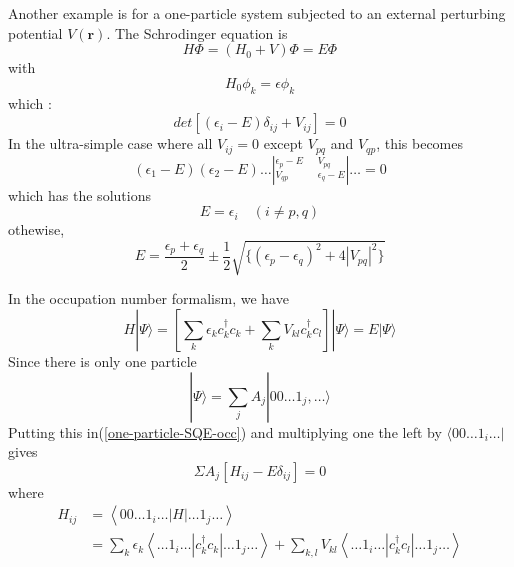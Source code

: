 Another example is for a one-particle system subjected to an external perturbing potential $V(\mathbf{r})$. The Schrodinger equation is
$$
H\Phi=(H_0+V)\Phi=E\Phi
$$
with
$$
H_0\phi_k=\epsilon\phi_k
$$
which \textbf{}:
$$
det[(\epsilon_i-E)\delta_{ij}+V_{ij}]=0
$$
In the ultra-simple case where all $V_{ij}=0$ except $V_{pq}$ and $V_{qp}$, this becomes
$$\left(\epsilon_{1}-E\right)\left(\epsilon_{2}-E\right) \ldots\left|_{V_{q p}} ^{\epsilon_{p}-E}\quad {}^{V_{p q}}_{\epsilon_{q}-E} \right| \ldots=0$$
which has the solutions
$$
E=\epsilon_i\quad(i\neq p,q)
$$
othewise,
$$E=\frac{\epsilon_{p}+\epsilon_{q}}{2} \pm \frac{1}{2} \sqrt{\{\left(\epsilon_{p}-\epsilon_{q}\right)^{2}+4\left|V_{p q}\right|^{2}\}}$$

In the occupation number formalism, we have
\begin{equation}
    H|\Psi\rangle=\left[\sum_{k} \epsilon_{k} c_{k}^{\dagger}c_{k}+\sum_{k} V_{k l} c^{\dagger}_{k} c_{l}\right]|\Psi\rangle=E|\Psi\rangle
\label{one-particle-SQE-occ}
\end{equation}
Since there is only one particle
$$|\Psi\rangle=\sum_{j} A_{j}|00 \ldots 1_j, \ldots\rangle$$
Putting this in(\ref{one-particle-SQE-occ}) and multiplying one the left by $\langle00\ldots 1_i\ldots|$ gives
$$\Sigma A_{j}\left[H_{ij}-E \delta_{ij}\right]=0$$
where
$$\begin{aligned}
H_{i j} &=\left\langle 00 \ldots 1_{i} \ldots|H| \ldots 1_{j} \ldots\right\rangle \\
&=\sum_{k} \epsilon_{k}\left\langle\ldots 1_{i} \ldots\left|c_{k}^{\dagger} c_{k}\right| \ldots 1_{j} \ldots\right\rangle+\sum_{k, l} V_{k l}\left\langle\ldots 1_{i} \ldots\left|c_{k}^{\dagger} c_{l}\right| \ldots 1_{j} \ldots\right\rangle
\end{aligned}$$

